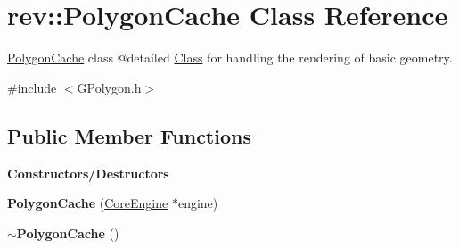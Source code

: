 \hypertarget{classrev_1_1_polygon_cache}{}\section{rev\+::Polygon\+Cache Class Reference}
\label{classrev_1_1_polygon_cache}


\mbox{\hyperlink{classrev_1_1_polygon_cache}{Polygon\+Cache}} class @detailed \mbox{\hyperlink{struct_class}{Class}} for handling the rendering of basic geometry.  




{\ttfamily \#include $<$G\+Polygon.\+h$>$}

\subsection*{Public Member Functions}
\begin{Indent}\textbf{ Constructors/\+Destructors}\par
\begin{DoxyCompactItemize}
\item 
\mbox{\label{classrev_1_1_polygon_cache_a151daa54b737ac6d97d1e03f165ffd9d}} 
{\bfseries Polygon\+Cache} (\mbox{\hyperlink{classrev_1_1_core_engine}{Core\+Engine}} $\ast$engine)
\item 
\mbox{\label{classrev_1_1_polygon_cache_a40bb8a3efb51f884205fd7071bd43a27}} 
{\bfseries $\sim$\+Polygon\+Cache} ()
\end{DoxyCompactItemize}
\end{Indent}
